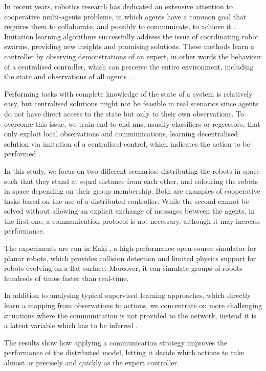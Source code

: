 In recent years, robotics research has dedicated an extensive attention to 
cooperative multi-agents problems, in which agents have a common goal that 
requires them to collaborate, and possibly to communicate, to achieve it 
\cite[][]{ismail2018survey}.
Imitation learning algorithms successfully address the issue of coordinating robot 
swarms, providing new insights and promising solutions. 
These methods learn a controller by observing demonstrations of an expert, in 
other words the behaviour of a centralised controller, which can perceive the 
entire environment, including the state and observations of all agents 
\cite[][]{billard2008survey, zhang2018deep}. 

Performing tasks with complete knowledge of the state of a system is relatively 
easy, but centralised solutions might not be feasible in real scenarios since agents 
do not have direct access to the state but only to their own observations.
To overcome this issue, we train end-to-end \glspl{nn}, usually classifiers or 
regressors, that only exploit local observations and communications, learning 
decentralised solution via imitation of a centralised control, which indicates the 
action to be performed \cite[][]{ross2011reduction, tolstaya2020learning}.

In this study, we focus on two different scenarios: distributing the robots in space 
such that they stand at equal distance from each other, and colouring the robots 
in space depending on their group membership.
Both are examples of cooperative tasks based on the use of a distributed 
controller. While the second cannot be solved without allowing an explicit 
exchange of messages between the agents, in the first one, a communication 
protocol is not necessary, although it may increase performance.

The experiments are run in Enki \cite[][]{enki}, a high-performance open-source 
simulator for planar robots, which provides collision detection and limited physics 
support for robots evolving on a flat surface. Moreover, it can simulate groups of 
robots hundreds of times faster than real-time.

In addition to analysing typical supervised learning approaches, which directly 
learn a mapping from observations to actions, we concentrate on more 
challenging situations where the communication is not provided to the network, 
instead it is a latent variable which has to be inferred \cite[][]{le2017coordinated, 
stadie2017third}.

The results show how applying a communication strategy improves the 
performance of the distributed model, letting it decide which actions to take 
almost as precisely and quickly as the expert controller.